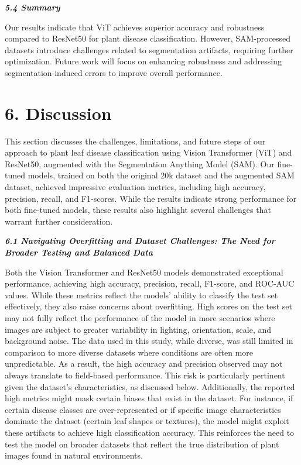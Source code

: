 \documentclass{article}
\begin{document}
\textbf{\textit{5.4 Summary}}


Our results indicate that ViT achieves superior accuracy and robustness compared to ResNet50 for plant disease classification. However, SAM-processed datasets introduce challenges related to segmentation artifacts, requiring further optimization. Future work will focus on enhancing robustness and addressing segmentation-induced errors to improve overall performance.





\section*{6. Discussion}

This section discusses the challenges, limitations, and future steps of our approach to plant leaf disease classification using Vision Transformer (ViT) and ResNet50, augmented with the Segmentation Anything Model (SAM). Our fine-tuned models, trained on both the original 20k dataset and the augmented SAM dataset, achieved impressive evaluation metrics, including high accuracy, precision, recall, and F1-scores. While the results indicate strong performance for both fine-tuned models, these results also highlight several challenges that warrant further consideration.


\textbf{\textit{6.1 Navigating Overfitting and Dataset Challenges: The Need for Broader Testing and Balanced Data}}


Both the Vision Transformer and ResNet50 models demonstrated exceptional performance, achieving high accuracy, precision, recall, F1-score, and ROC-AUC values. While these metrics reflect the models' ability to classify the test set effectively, they also raise concerns about overfitting. High scores on the test set may not fully reflect the performance of the model in more scenarios where images are subject to greater variability in lighting, orientation, scale, and background noise. The data used in this study, while diverse, was still limited in comparison to more diverse datasets where conditions are often more unpredictable. As a result, the high accuracy and precision observed may not always translate to field-based performance. This risk is particularly pertinent given the dataset's characteristics, as discussed below. Additionally, the reported high metrics might mask certain biases that exist in the dataset. For instance, if certain disease classes are over-represented or if specific image characteristics dominate the dataset (certain leaf shapes or textures), the model might exploit these artifacts to achieve high classification accuracy. This reinforces the need to test the model on broader datasets that reflect the true distribution of plant images found in natural environments.
\end{document}
